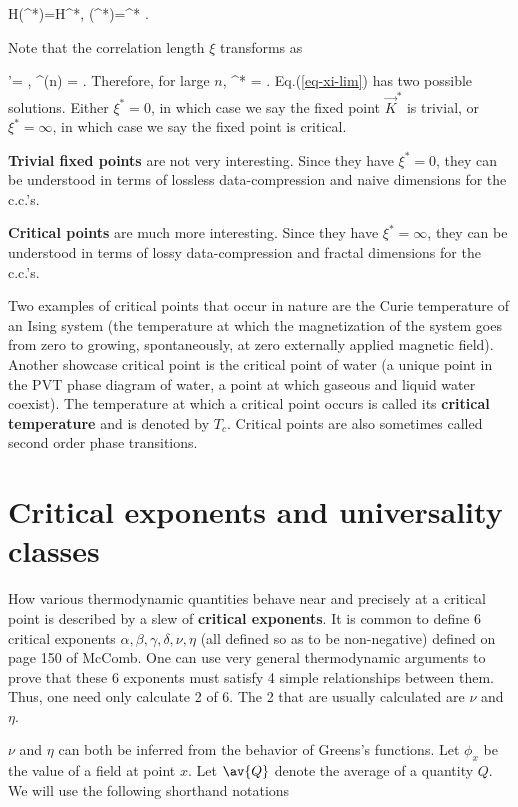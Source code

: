 \documentclass[12pt]{article}
\begin{document}
\beq
H(^*)=H^*,
\;\;
\xi(^*)=\xi^*
\;.
\eeq


Note that the correlation length
$\xi$ transforms as

\beq
\xi'=
\;,\;\;
\xi^{(n)} = 
\;.
\label{eq-xi-zero-to-n}
\eeq
Therefore, for large $n$,
\beq
\xi^* = 
\;.
\label{eq-xi-lim}
\eeq
Eq.(\ref{eq-xi-lim}) has two possible solutions.
Either $\xi^* = 0$, in which case
we say the fixed point $\vec{K}^*$
is trivial, or $\xi^* = \infty$,
in which case we say the fixed point
is critical.


\textbf{Trivial fixed points} are not
very interesting. Since they
have $\xi^*=0$, they can be understood
in terms of
lossless data-compression and
naive dimensions for the c.c.'s.

\textbf{Critical points}
are much more interesting.
Since they
have $\xi^*=\infty$, they can be understood
in terms of
lossy data-compression
and fractal dimensions for the c.c.'s.

Two examples of critical points that
occur in nature are the Curie temperature of
an Ising system (the temperature
at which the magnetization of the
system goes from
zero to growing, spontaneously, at zero
externally applied magnetic field).
Another showcase critical point is
the critical point of water (a
unique point in the PVT phase diagram
of water, a point at which gaseous and liquid
water coexist). The temperature at which
a critical point occurs
is called its {\bf critical temperature}
and is
denoted by $T_c$.
Critical points are also sometimes
called second
order phase transitions.


\section{Critical exponents and universality classes}
How various thermodynamic
quantities behave near and precisely
at a critical point is described
by a slew of
{\bf critical exponents}.
It is common to define
6 critical exponents $\alpha, \beta,
\gamma, \delta,\nu ,\eta$ (all defined
so as to be non-negative)
defined on page 150 of McComb.
One
can use very general
thermodynamic arguments to prove
that these 6 exponents must satisfy
4 simple relationships
between them. Thus,
one need only calculate 2 of
6. The 2 that are usually calculated
are
$\nu$ and $\eta$.

$\nu$ and $\eta$
can both be inferred
from the behavior of Greens's functions.
Let $\phi_x$ be the value of
a field at point $x$. Let
$\av{Q}$
denote the average of a
quantity $Q$. We will use the
following shorthand notations
\end{document}
